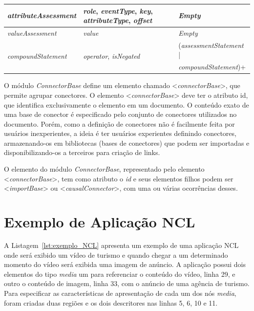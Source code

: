 \begin{table}[!ht]
{\begin{tabular}{|p{4cm}|p{5cm}|p{6cm}|}
    \textit{attributeAssessment} & \textit{role}, \textit{eventType}, \textit{key},
                          \textit{attributeType}, \textit{offset}  & \textit{Empty}\\\hline
    \textit{valueAssessment} & \textit{value} & \textit{Empty}\\\hline
    
    \multirow{2}{*}{\textit{compoundStatement}} & \multirow{2}{*}{\textit{operator}, \textit{isNegated}}
                                & (\textit{assessmentStatement} |\\
                                && \textit{compoundStatement})+\\\hline
  \end{tabular}
}
\end{table}

O módulo \textit{ConnectorBase} define um elemento chamado <\textit{connectorBase}>, que permite agrupar conectores. O elemento <\textit{connectorBase}> deve ter o atributo id, que identifica exclusivamente o elemento em um documento. O conteúdo exato de uma base de conector é especificado pelo conjunto de conectores utilizados no documento. Porém, como a definição de conectores não é facilmente feita por usuários inexperientes, a ideia é ter usuários experientes definindo conectores, armazenando-os em bibliotecas (bases de conectores) que podem ser importadas e disponibilizando-os a terceiros para criação de links.

O elemento do módulo \textit{ConnectorBase}, representado pelo elemento <\textit{connectorBase}>, tem como atributo o \textit{id} e seus elementos filhos podem ser <\textit{importBase}> ou <\textit{causalConnector}>, com uma ou várias ocorrências desses.

\section{Exemplo de Aplicação NCL} 

A Listagem~\ref{lst:exemplo_NCL} apresenta um exemplo de uma aplicação NCL onde será exibido um vídeo de turismo
e quando chegar a um determinado momento do vídeo será exibida uma imagem de anúncio. A aplicação possui dois elementos do tipo \textit{media} um para referenciar o conteúdo do vídeo, linha 29, e outro o conteúdo de imagem, linha 33, com o anúncio de uma agência de turismo. Para especificar as características de apresentação de cada um dos nós \textit{media}, foram criadas duas regiões e os dois descritores nas linhas 5, 6, 10 e 11. 

